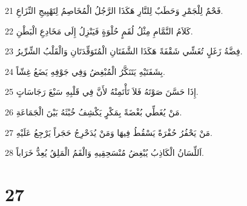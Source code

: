 \par 21 فَحْمٌ لِلْجَمْرِ وَحَطَبٌ لِلنَّارِ هَكَذَا الرَّجُلُ الْمُخَاصِمُ لِتَهْيِيجِ النِّزَاعِ.
\par 22 كَلاَمُ النَّمَّامِ مِثْلُ لُقَمٍ حُلْوَةٍ فَيَنْزِلُ إِلَى مَخَادِعِ الْبَطْنِ.
\par 23 فِضَّةُ زَغَلٍ تُغَشِّي شَقْفَةً هَكَذَا الشَّفَتَانِ الْمُتَوَقِّدَتَانِ وَالْقَلْبُ الشِّرِّيرُ.
\par 24 بِشَفَتَيْهِ يَتَنَكَّرُ الْمُبْغِضُ وَفِي جَوْفِهِ يَضَعُ غِشّاً.
\par 25 إِذَا حَسَّنَ صَوْتَهُ فَلاَ تَأْتَمِنْهُ لأَنَّ فِي قَلْبِهِ سَبْعَ رَجَاسَاتٍ.
\par 26 مَنْ يُغَطِّي بُغْضَةً بِمَكْرٍ يَكْشِفُ خُبْثَهُ بَيْنَ الْجَمَاعَةِ.
\par 27 مَنْ يَحْفُرُ حُفْرَةً يَسْقُطُ فِيهَا وَمَنْ يُدَحْرِجُ حَجَراً يَرْجِعُ عَلَيْهِ.
\par 28 اَللِّسَانُ الْكَاذِبُ يُبْغِضُ مُنْسَحِقِيهِ وَالْفَمُ الْمَلِقُ يُعِدُّ خَرَاباً.

\chapter{27}

